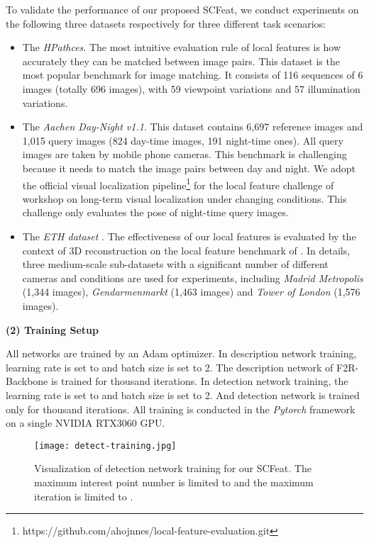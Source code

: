 \documentclass[journal]{IEEEtran}
\begin{document}
To validate the performance of our proposed SCFeat, we conduct experiments on the following three datasets respectively for three different task scenarios:
\begin{itemize}
\item{
The \emph{HPathces}\cite{HPatches}.
The most intuitive evaluation rule of local features is how accurately they can be matched between image pairs. This dataset is the most popular benchmark for image matching. It consists of 116 sequences of 6 images (totally 696 images), with 59 viewpoint variations and 57 illumination variations. 
}
\item{
The \emph{Aachen Day-Night v1.1}\cite{aachen}.
This dataset contains 6,697 reference images and 1,015 query images (824 day-time images, 191 night-time ones). All query images are taken by mobile phone cameras. This benchmark is challenging because it needs to match the image pairs between day and night. We adopt the official visual localization pipeline\footnote{https://github.com/ahojnnes/local-feature-evaluation.git} for the local feature challenge of workshop on long-term visual localization under changing conditions. This challenge only evaluates the pose of night-time query images.
}
\item{
The \emph{ETH dataset }\cite{ETH}.
The effectiveness of our local features is evaluated by the context of 3D reconstruction on the local feature benchmark of . In details, three medium-scale sub-datasets with a significant number of different cameras and conditions are used for experiments, including \emph{Madrid Metropolis} (1,344 images), \emph{Gendarmenmarkt} (1,463 images) and \emph{Tower of London} (1,576 images).
}

\end{itemize}



\textbf{(2) Training Setup}

All networks are trained by an Adam optimizer. In description network training, learning rate is set to  and batch size is set to 2. The description network of F2R-Backbone is trained for  thousand iterations. In detection network training, the learning rate is set to  and batch size is set to 2. And detection network is trained only for  thousand iterations. All training is conducted in the \emph{Pytorch} framework on a single NVIDIA RTX3060 GPU. 


\begin{figure*}[h]
\centering
\texttt{[image: detect-training.jpg]}
\caption{Visualization of detection network training for our SCFeat. The maximum interest point number is limited to  and the maximum iteration is limited to .}
\label{fig30}
\end{figure*}
\end{document}
